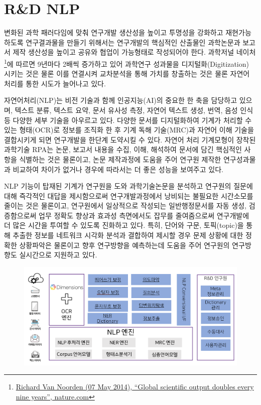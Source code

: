 \documentclass[smallextended]{svjour3}       %
\begin{document}
\hypertarget{rd-nlp}{%
\section{R\&D NLP}\label{rd-nlp}}

변화된 과학 패러다임에 맞춰 연구개발 생산성을 높이고 투명성을 강화하고
재현가능하도록 연구결과물을 만들기 위해서는 연구개발의 핵심적인 산출물인
과학논문과 보고서 제작 생산성을 높이고 공유와 협업이 가능형태로
작성되어야 한다. 과학저널 네이처\footnote{\href{http://blogs.nature.com/news/2014/05/global-scientific-output-doubles-every-nine-years.html}{Richard
  Van Noorden (07 May 2014), ``Global scientific output doubles every
  nine years'', nature.com}}에 따르면 9년마다 2배씩 증가하고 있어
과학연구 성과물을 디지털화(Digitization) 시키는 것은 물론 이를 연결시켜
교차분석을 통해 가치를 창출하는 것은 물론 자연어 처리를 통한 시도가
늘어나고 있다.

자연어처리(NLP)는 비전 기술과 함께 인공지능(AI)의 중요한 한 축을
담당하고 있으며, 텍스트 분류, 텍스트 요약, 문서 유사성 측정, 자연어
텍스트 생성, 번역, 음성 인식 등 다양한 세부 기술을 아우르고 있다. 다양한
문서를 디지털화하여 기계가 처리할 수 있는 형태(OCR)로 정보를 조직화 한
후 기계 독해 기술(MRC)과 자연어 이해 기술을 결합시키게 되면 연구개발을
한단계 도약시킬 수 있다. 자연어 처리 기계모형이 장착된 과학기술 RPA는
논문, 보고서 내용을 수집, 이해, 해석하여 문서에 담긴 핵심적인 사항을
식별하는 것은 물론이고, 논문 제작과정에 도움을 주어 연구원 제작한
연구성과물과 비교하여 차이가 없거나 경우에 따라서는 더 좋은 성능을
보여주고 있다.

NLP 기능이 탑재된 기계가 연구원을 도와 과학기술논문을 분석하고 연구원의
질문에 대해 즉각적인 대답을 제시함으로써 연구개발과정에서 낭비되는
불필요한 시간소모를 줄이는 것은 물론이고, 연구원에서 일상적으로 작성되는
일반행정문서를 자동 생성, 검증함으로써 업무 정확도 향상과 효과성
측면에서도 잡무를 줄여줌으로써 연구개발에 더 많은 시간을 투여할 수
있도록 진화하고 있다. 특히, 단어와 구문, 토픽(topic)을 통해 추출한
정보를 네트워크 시각화 분석과 결합하여 제시할 경우 문제 상황에 대한
정확한 상황파악은 물론이고 향후 연구방향을 예측하는데 도움을 주어
연구원의 연구방향도 실시간으로 지원하고 있다.

\begin{figure}

{\centering \includegraphics[width=1\linewidth]{fig/nlp-rnd-engine} 

}

\end{figure}
\end{document}
